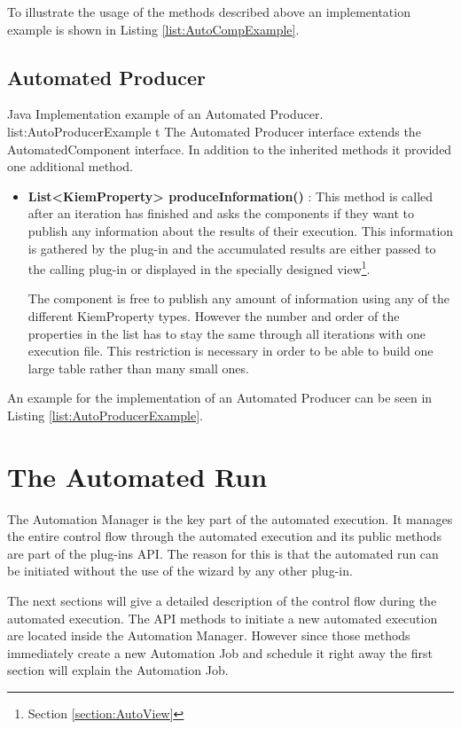 To illustrate the usage of the methods described above an implementation example
is shown in Listing \ref{list:AutoCompExample}.

\subsection{Automated Producer}
\label{section:AutomatedProducer}
\listingjava
{}
{Java}
{Implementation example of an Automated Producer.}
{list:AutoProducerExample}
{t}
The Automated Producer interface extends the AutomatedComponent interface.
In addition to the inherited methods it provided one additional method.

\begin{itemize}
 \item \textbf{List<KiemProperty> produceInformation()} : 
This method is called after an iteration has finished and asks the components
if they want to publish any information about the results of their execution.
This information is gathered by the plug-in and the accumulated results
are either passed to the calling plug-in or displayed in the
specially designed view\footnote{Section \ref{section:AutoView}}.

The component is free to publish any amount of information using any of the 
different KiemProperty types. However the number and order of the properties
in the list has to stay the same through all iterations with one execution file.
This restriction is necessary in order to be able to build one large table
rather than many small ones.
\end{itemize}

An example for the implementation of an Automated Producer can be seen in
Listing \ref{list:AutoProducerExample}. 


\section{The Automated Run}
\label{section:AutomatedRun}
The Automation Manager is the key part of the automated execution. It manages the entire control flow
through the automated execution and its public methods are part of the plug-ins \ac{API}. The reason
for this is that the automated run can be initiated without the use of the wizard by any other
plug-in.

The next sections will give a detailed description of the control flow during the automated execution.
The \ac{API} methods to initiate a new automated execution are located inside the Automation Manager. However
since those methods immediately create a new Automation Job and schedule it right away the first section will
explain the Automation Job. 

